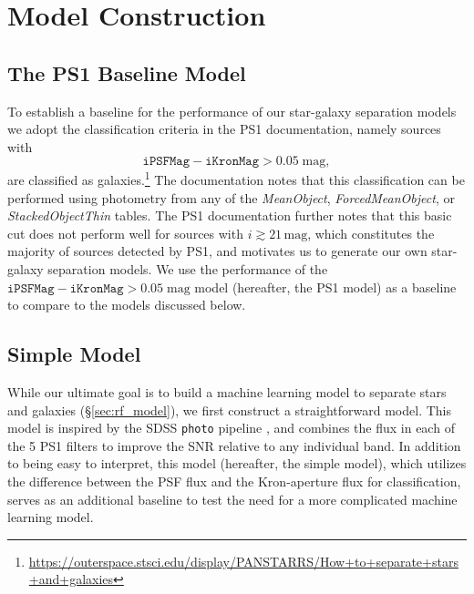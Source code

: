 \documentclass[twocolumn]{aastex62}
\begin{document}
\section{Model Construction}
\subsection{The PS1 Baseline Model}\label{sec:ps1_model}

To establish a baseline for the performance of our star-galaxy separation models we adopt the classification criteria in the PS1 documentation, namely sources with
$$ \mathtt{iPSFMag} - \mathtt{iKronMag} > 0.05\;\mathrm{mag},$$
are classified as galaxies.\footnote{\url{https://outerspace.stsci.edu/display/PANSTARRS/How+to+separate+stars+and+galaxies}} The documentation notes that this classification can be performed using photometry from any of the \textit{MeanObject}, \textit{ForcedMeanObject}, or \textit{StackedObjectThin} tables. The PS1 documentation further notes that this basic cut does not perform well for sources with $i \gtrsim 21\,\mathrm{mag}$, which constitutes the majority of sources detected by PS1, and motivates us to generate our own star-galaxy separation models. We use the performance of the $\mathtt{iPSFMag} - \mathtt{iKronMag} > 0.05\;\mathrm{mag}$ model (hereafter, the PS1 model) as a baseline to compare to the models discussed below.

\subsection{Simple Model}\label{sec:simple_model}

While our ultimate goal is to build a machine learning model to separate stars and galaxies (\S\ref{sec:rf_model}), we first construct a straightforward model. This model is inspired by the SDSS \texttt{photo} pipeline \citep{Lupton01}, and combines the flux in each of the 5 PS1 filters to improve the SNR relative to any individual band. In addition to being easy to interpret, this model (hereafter, the simple model), which utilizes the difference between the PSF flux and the Kron-aperture flux for classification, serves as an additional baseline to test the need for a more complicated machine learning model. 
\end{document}
